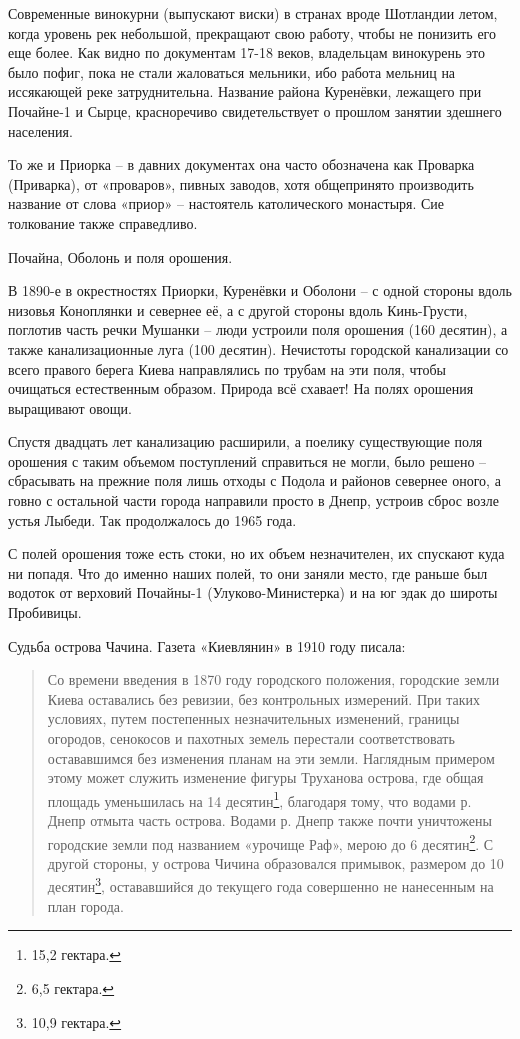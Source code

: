 Современные винокурни (выпускают виски) в странах вроде Шотландии летом, когда уровень рек небольшой, прекращают свою работу, чтобы не понизить его еще более. Как видно по документам 17-18 веков, владельцам винокурень это было пофиг, пока не стали жаловаться мельники, ибо работа мельниц на иссякающей реке затруднительна. Название района Куренёвки, лежащего при Почайне-1 и Сырце, красноречиво свидетельствует о прошлом занятии здешнего населения.

То же и Приорка – в давних документах она часто обозначена как Проварка (Приварка), от «проваров», пивных заводов, хотя общепринято производить название от слова «приор» – настоятель католического монастыря. Сие толкование также справедливо.

Почайна, Оболонь и поля орошения.

В 1890-е в окрестностях Приорки, Куренёвки и Оболони – с одной стороны вдоль низовья Коноплянки и севернее её, а с другой стороны вдоль Кинь-Грусти, поглотив часть речки Мушанки – люди устроили поля орошения (160 десятин), а также канализационные луга (100 десятин). Нечистоты городской канализации со всего правого берега Киева направлялись по трубам на эти поля, чтобы очищаться естественным образом. Природа всё схавает! На полях орошения выращивают овощи. 

Спустя двадцать лет канализацию расширили, а поелику существующие поля орошения с таким объемом поступлений справиться не могли, было решено – сбрасывать на прежние поля лишь отходы с Подола и районов севернее оного, а говно с остальной части города направили просто в Днепр, устроив сброс возле устья Лыбеди. Так продолжалось до 1965 года.

С полей орошения тоже есть стоки, но их объем незначителен, их спускают куда ни попадя. Что до именно наших полей, то они заняли место, где раньше был водоток от верховий Почайны-1 (Улуково-Министерка) и на юг эдак до широты Пробивицы.

Судьба острова Чачина. Газета «Киевлянин» в 1910 году писала:

\begin{quotation}
Со времени введения в 1870 году городского положения, городские земли Киева оставались без ревизии, без контрольных измерений. При таких условиях, путем постепенных незначительных изменений, границы огородов, сенокосов и пахотных земель перестали соответствовать остававшимся без изменения планам на эти земли. Наглядным примером этому может служить изменение фигуры Труханова острова, где общая площадь уменьшилась на 14 десятин\footnote{15,2 гектара.}, благодаря тому, что водами р. Днепр отмыта часть острова. Водами р. Днепр также почти уничтожены городские земли под названием «урочище Раф», мерою до 6 десятин\footnote{6,5 гектара.}. С другой стороны, у острова Чичина образовался примывок, размером до 10 десятин\footnote{10,9 гектара.}, остававшийся до текущего года совершенно не нанесенным на план города. 
\end{quotation}

